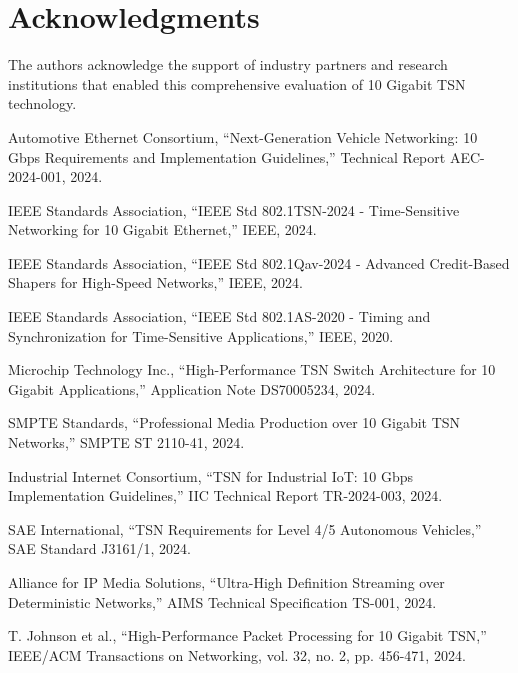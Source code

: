 \documentclass[10pt, journal, compsoc]{IEEEtran}
\begin{document}
\section{Acknowledgments}

The authors acknowledge the support of industry partners and research institutions that enabled this comprehensive evaluation of 10 Gigabit TSN technology.




\begin{thebibliography}{20}

Automotive Ethernet Consortium, ``Next-Generation Vehicle Networking: 10 Gbps Requirements and Implementation Guidelines,'' Technical Report AEC-2024-001, 2024.

IEEE Standards Association, ``IEEE Std 802.1TSN-2024 - Time-Sensitive Networking for 10 Gigabit Ethernet,'' IEEE, 2024.

IEEE Standards Association, ``IEEE Std 802.1Qav-2024 - Advanced Credit-Based Shapers for High-Speed Networks,'' IEEE, 2024.

IEEE Standards Association, ``IEEE Std 802.1AS-2020 - Timing and Synchronization for Time-Sensitive Applications,'' IEEE, 2020.

Microchip Technology Inc., ``High-Performance TSN Switch Architecture for 10 Gigabit Applications,'' Application Note DS70005234, 2024.

SMPTE Standards, ``Professional Media Production over 10 Gigabit TSN Networks,'' SMPTE ST 2110-41, 2024.

Industrial Internet Consortium, ``TSN for Industrial IoT: 10 Gbps Implementation Guidelines,'' IIC Technical Report TR-2024-003, 2024.

SAE International, ``TSN Requirements for Level 4/5 Autonomous Vehicles,'' SAE Standard J3161/1, 2024.

Alliance for IP Media Solutions, ``Ultra-High Definition Streaming over Deterministic Networks,'' AIMS Technical Specification TS-001, 2024.

T. Johnson et al., ``High-Performance Packet Processing for 10 Gigabit TSN,'' IEEE/ACM Transactions on Networking, vol. 32, no. 2, pp. 456-471, 2024.

\end{thebibliography}
\end{document}
